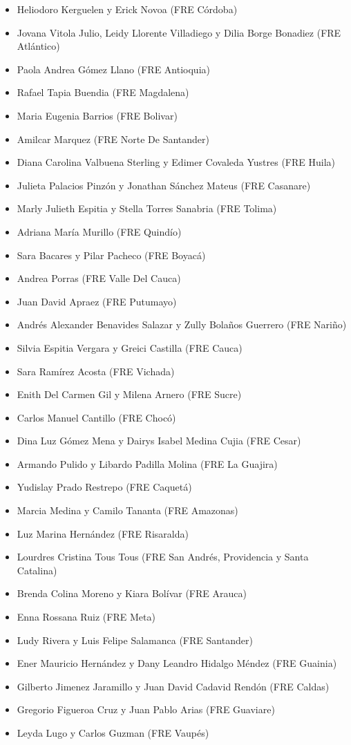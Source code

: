 \documentclass[
  oneside]{book}
\begin{document}
\begin{itemize}
\item
  Heliodoro Kerguelen y Erick Novoa (FRE Córdoba)
\item
  Jovana Vitola Julio, Leidy Llorente Villadiego y Dilia Borge Bonadiez (FRE Atlántico)
\item
  Paola Andrea Gómez Llano (FRE Antioquia)
\item
  Rafael Tapia Buendia (FRE Magdalena)
\item
  Maria Eugenia Barrios (FRE Bolivar)
\item
  Amilcar Marquez (FRE Norte De Santander)
\item
  Diana Carolina Valbuena Sterling y Edimer Covaleda Yustres (FRE Huila)
\item
  Julieta Palacios Pinzón y Jonathan Sánchez Mateus (FRE Casanare)
\item
  Marly Julieth Espitia y Stella Torres Sanabria (FRE Tolima)
\item
  Adriana María Murillo (FRE Quindío)
\item
  Sara Bacares y Pilar Pacheco (FRE Boyacá)
\item
  Andrea Porras (FRE Valle Del Cauca)
\item
  Juan David Apraez (FRE Putumayo)
\item
  Andrés Alexander Benavides Salazar y Zully Bolaños Guerrero (FRE Nariño)
\item
  Silvia Espitia Vergara y Greici Castilla (FRE Cauca)
\item
  Sara Ramírez Acosta (FRE Vichada)
\item
  Enith Del Carmen Gil y Milena Arnero (FRE Sucre)
\item
  Carlos Manuel Cantillo (FRE Chocó)
\item
  Dina Luz Gómez Mena y Dairys Isabel Medina Cujia (FRE Cesar)
\item
  Armando Pulido y Libardo Padilla Molina (FRE La Guajira)
\item
  Yudislay Prado Restrepo (FRE Caquetá)
\item
  Marcia Medina y Camilo Tananta (FRE Amazonas)
\item
  Luz Marina Hernández (FRE Risaralda)
\item
  Lourdres Cristina Tous Tous (FRE San Andrés, Providencia y Santa Catalina)
\item
  Brenda Colina Moreno y Kiara Bolívar (FRE Arauca)
\item
  Enna Rossana Ruiz (FRE Meta)
\item
  Ludy Rivera y Luis Felipe Salamanca (FRE Santander)
\item
  Ener Mauricio Hernández y Dany Leandro Hidalgo Méndez (FRE Guainia)
\item
  Gilberto Jimenez Jaramillo y Juan David Cadavid Rendón (FRE Caldas)
\item
  Gregorio Figueroa Cruz y Juan Pablo Arias (FRE Guaviare)
\item
  Leyda Lugo y Carlos Guzman (FRE Vaupés)
\end{itemize}
\end{document}
